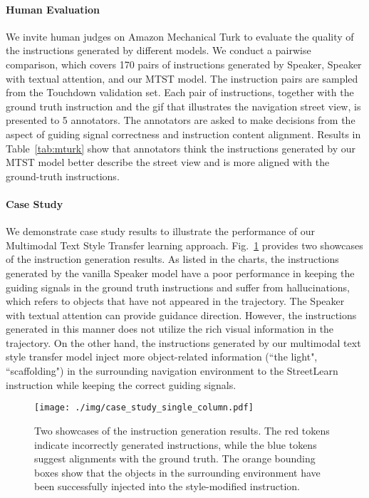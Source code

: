 \documentclass[11pt,a4paper]{article}
\begin{document}
\paragraph{Human Evaluation}
We invite human judges on Amazon Mechanical Turk to evaluate the quality of the instructions generated by different models.
We conduct a pairwise comparison, which covers 170 pairs of instructions generated by Speaker, Speaker with textual attention, and our MTST model. The instruction pairs are sampled from the Touchdown validation set. 
Each pair of instructions, together with the ground truth instruction and the gif that illustrates the navigation street view, is presented to 5 annotators. The annotators are asked to make decisions from the aspect of guiding signal correctness and instruction content alignment.
Results in Table~\ref{tab:mturk} show that annotators think the instructions generated by our MTST model better describe the street view and is more aligned with the ground-truth instructions. 





\paragraph{Case Study}
We demonstrate case study results to illustrate the performance of our Multimodal Text Style Transfer learning approach. Fig.~\ref{fig:case_study_style} provides two showcases of the instruction generation results. As listed in the charts, the instructions generated by the vanilla Speaker model have a poor performance in keeping the guiding signals in the ground truth instructions and suffer from hallucinations, which refers to objects that have not appeared in the trajectory. 
The Speaker with textual attention can provide guidance direction. However, the instructions generated in this manner does not utilize the rich visual information in the trajectory. On the other hand, the instructions generated by our multimodal text style transfer model inject more object-related information (``the light", ``scaffolding") in the surrounding navigation environment to the StreetLearn instruction while keeping the correct guiding signals. 


\begin{figure}[t]
\vspace{-3ex}
\centering
\texttt{[image: ./img/case\_study\_single\_column.pdf]}
\caption{Two showcases of the instruction generation results. 
The red tokens indicate incorrectly generated instructions, while the blue tokens suggest alignments with the ground truth. The orange bounding boxes show that the objects in the surrounding environment have been successfully injected into the style-modified instruction. }
\label{fig:case_study_style}
\vspace{-2ex}
\end{figure}
\end{document}
